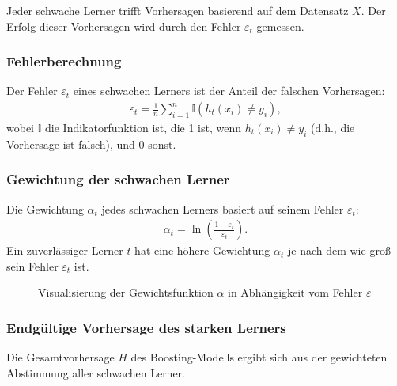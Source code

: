 Jeder schwache Lerner trifft Vorhersagen basierend auf dem Datensatz \( X \). Der Erfolg dieser Vorhersagen wird durch den Fehler \( \varepsilon_t \) gemessen.

\subsubsection{Fehlerberechnung}
Der Fehler \( \varepsilon_t \) eines schwachen Lerners ist der Anteil der falschen Vorhersagen:
\begin{gather}
    \varepsilon_t = \frac{1}{n} \sum_{i=1}^{n} \mathbb{I}(h_t(x_i) \neq y_i),
\end{gather}
wobei \( \mathbb{I} \) die Indikatorfunktion ist, die 1 ist, wenn \( h_t(x_i) \neq y_i \) (d.h., die Vorhersage ist falsch), und 0 sonst.

\subsubsection{Gewichtung der schwachen Lerner}
Die Gewichtung \( \alpha_t \) jedes schwachen Lerners basiert auf seinem Fehler \( \varepsilon_t \):
\begin{gather}
    \alpha_t = \ln\left(\frac{1 - \varepsilon_t}{\varepsilon_t}\right).
\end{gather}
Ein zuverlässiger Lerner \( t \) hat eine höhere Gewichtung \( \alpha_t \) je nach dem wie groß sein Fehler \( \varepsilon_t \) ist.

\begin{figure}[h]
    \centering
    \caption{Visualisierung der Gewichtsfunktion \( \alpha \) in Abhängigkeit vom Fehler \( \varepsilon \)}
    \label{fig:alpha_plot}
\end{figure}
    

\subsubsection{Endgültige Vorhersage des starken Lerners}
Die Gesamtvorhersage \( H \) des Boosting-Modells ergibt sich aus der gewichteten Abstimmung aller schwachen Lerner.

